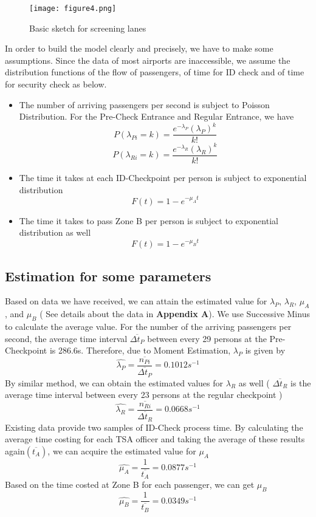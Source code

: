 \documentclass{mcmthesis}
\begin{document}
\begin{figure}[h]
\small
\centering
\texttt{[image: figure4.png]}
\caption{Basic sketch for screening lanes} \label{fig:Basic sketch for screening lanes}
\end{figure}
In order to build the model clearly and precisely, we have to make some assumptions. Since the data of most airports are inaccessible, we assume the distribution functions of the flow of passengers, of time for ID check and of time for security check as below.
\begin{itemize}
\item The number of arriving passengers per second is subject to Poisson Distribution. For the Pre-Check Entrance and Regular Entrance, we have
$$P(\lambda_{Pi}=k)=\frac{e^{-\lambda_P}(\lambda_P)^k}{k!}$$
$$P(\lambda_{Ri}=k)=\frac{e^{-\lambda_R}(\lambda_R)^k}{k!}$$
\item The time it takes at each ID-Checkpoint per person is subject to exponential distribution
$$F(t)=1-e^{-\mu_At}$$
\item The time it takes to pass Zone B per person is subject to exponential distribution as well
$$F(t)=1-e^{-\mu_Bt}$$
\end{itemize}
\subsection{Estimation for some parameters}
Based on data we have received, we can attain the estimated value for $\lambda_P$, $\lambda_R$, $\mu_A$, and $\mu_B$ ( See details about the data in \textbf{Appendix A}). We use Successive Minus to calculate the average value. For the number of the arriving passengers per second, the average time interval $\overline{\Delta t_P}$ between every 29 persons at the Pre-Checkpoint is 286.6s. Therefore, due to Moment Estimation, $\lambda_P$ is given by
$$\widehat{\lambda_P}=\frac{\overline{n_{Pi}}}{\overline{\Delta t_P}}=0.1012s^{-1}$$
By similar method, we can obtain the estimated values for $\lambda_R$ as well ( $\overline{\Delta t_R}$ is the average time interval between every 23 persons at the regular checkpoint )
$$\widehat{\lambda_R}=\frac{\overline{n_{Ri}}}{\overline{\Delta t_R}}=0.0668s^{-1}$$
Existing data provide two samples of ID-Check process time. By calculating the average time costing for each TSA officer and taking the average of these results again$(\overline{t_A})$, we can acquire the estimated value for $\mu_A$
$$\widehat{\mu_A}=\frac{1}{\overline{t_A}}=0.0877s^{-1}$$
Based on the time costed at Zone B for each passenger, we can get $\mu_B$
$$\widehat{\mu_B}=\frac{1}{\overline{t_B}}=0.0349s^{-1}$$
\end{document}
